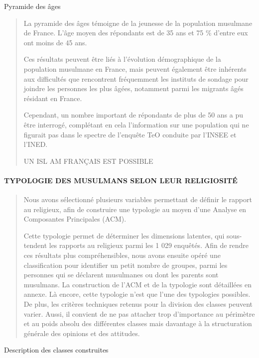Pyramide des âges

\begin{quote}
La pyramide des âges témoigne de la jeunesse de la population musulmane
de France. L'âge moyen des répondants est de 35 ans et 75 \% d'entre eux
ont moins de 45 ans.

Ces résultats peuvent être liés à l'évolution démographique de la
population musulmane en France, mais peuvent également être inhérents
aux difficultés que rencontrent fréquemment les instituts de sondage
pour joindre les personnes les plus âgées, notamment parmi les migrants
âgés résidant en France.

Cependant, un nombre important de répondants de plus de 50 ans a pu être
interrogé, complétant en cela l'information sur une population qui ne
figurait pas dans le spectre de l'enquête TeO conduite par l'INSEE et
l'INED.

UN ISL AM FRANÇAIS EST POSSIBLE
\end{quote}

\hypertarget{typologie-des-musulmans-selon-leur-religiosituxe9}{%
\paragraph{TYPOLOGIE DES MUSULMANS SELON LEUR
RELIGIOSITÉ}\label{typologie-des-musulmans-selon-leur-religiosituxe9}}

\begin{quote}
Nous avons sélectionné plusieurs variables permettant de définir le
rapport au religieux, afin de construire une typologie au moyen d'une
Analyse en Composantes Principales (ACM).

Cette typologie permet de déterminer les dimensions latentes, qui
sous-tendent les rapports au religieux parmi les 1 029 enquêtés. Afin de
rendre ces résultats plus compréhensibles, nous avons ensuite opéré une
classification pour identifier un petit nombre de groupes, parmi les
personnes qui se déclarent musulmanes ou dont les parents sont
musulmans. La construction de l'ACM et de la typologie sont détaillées
en annexe. Là encore, cette typologie n'est que l'une des typologies
possibles. De plus, les critères techniques retenus pour la division des
classes peuvent varier. Aussi, il convient de ne pas attacher trop
d'importance au périmètre et au poids absolu des différentes classes
mais davantage à la structuration générale des opinions et des
attitudes.
\end{quote}

Description des classes construites

